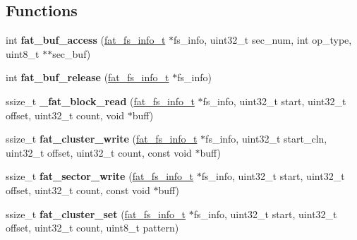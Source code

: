 \subsection*{Functions}
\begin{DoxyCompactItemize}
\item 
\mbox{\label{group__libfs__dosfs_ga669988205eb1272951a456f56a48f303}} 
int {\bfseries fat\+\_\+buf\+\_\+access} (\mbox{\hyperlink{structfat__fs__info__s}{fat\+\_\+fs\+\_\+info\+\_\+t}} $\ast$fs\+\_\+info, uint32\+\_\+t sec\+\_\+num, int op\+\_\+type, uint8\+\_\+t $\ast$$\ast$sec\+\_\+buf)
\item 
\mbox{\label{group__libfs__dosfs_gaff6a2d4c121c756651e1a03404d7ee4c}} 
int {\bfseries fat\+\_\+buf\+\_\+release} (\mbox{\hyperlink{structfat__fs__info__s}{fat\+\_\+fs\+\_\+info\+\_\+t}} $\ast$fs\+\_\+info)
\item 
\mbox{\label{group__libfs__dosfs_ga46ddcd1849e8bbb5e40ace3e14c11e3d}} 
ssize\+\_\+t {\bfseries \+\_\+fat\+\_\+block\+\_\+read} (\mbox{\hyperlink{structfat__fs__info__s}{fat\+\_\+fs\+\_\+info\+\_\+t}} $\ast$fs\+\_\+info, uint32\+\_\+t start, uint32\+\_\+t offset, uint32\+\_\+t count, void $\ast$buff)
\item 
\mbox{\label{group__libfs__dosfs_ga003406faf6db30550b09078a77738b13}} 
ssize\+\_\+t {\bfseries fat\+\_\+cluster\+\_\+write} (\mbox{\hyperlink{structfat__fs__info__s}{fat\+\_\+fs\+\_\+info\+\_\+t}} $\ast$fs\+\_\+info, uint32\+\_\+t start\+\_\+cln, uint32\+\_\+t offset, uint32\+\_\+t count, const void $\ast$buff)
\item 
\mbox{\label{group__libfs__dosfs_ga634cceef830b5bf08d1c317cd8f09cba}} 
ssize\+\_\+t {\bfseries fat\+\_\+sector\+\_\+write} (\mbox{\hyperlink{structfat__fs__info__s}{fat\+\_\+fs\+\_\+info\+\_\+t}} $\ast$fs\+\_\+info, uint32\+\_\+t start, uint32\+\_\+t offset, uint32\+\_\+t count, const void $\ast$buff)
\item 
\mbox{\label{group__libfs__dosfs_gaad61914265a74a24c7f1ac3a65294445}} 
ssize\+\_\+t {\bfseries fat\+\_\+cluster\+\_\+set} (\mbox{\hyperlink{structfat__fs__info__s}{fat\+\_\+fs\+\_\+info\+\_\+t}} $\ast$fs\+\_\+info, uint32\+\_\+t start, uint32\+\_\+t offset, uint32\+\_\+t count, uint8\+\_\+t pattern)
$$
\end{DoxyCompactItemize}
